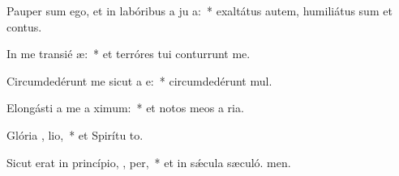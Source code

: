 \item Pauper sum ego, et in labóribus a ju a:~* exaltátus autem, humiliátus sum et contus.
\item In me transié  æ:~* et terróres tui conturrunt me.
\item Circumdedérunt me sicut a  e:~* circumdedérunt  mul.
\item Elongásti a me a  ximum:~* et notos meos a ria.
\item Glória ,  lio,~* et Spirítu to.
\item Sicut erat in princípio,  ,  per,~* et in sǽcula sæculó. men.
